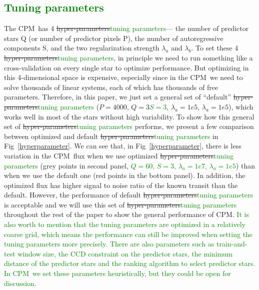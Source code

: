 \documentclass[12pt, preprint]{aastex}
\newcommand{\name}{CPM}
\newcommand{\revise}[1]{\textcolor{green}{#1}}
\newcommand{\remove}[1]{\sout{#1}}
\begin{document}
\subsection{\revise{Tuning parameters}}
The \name\ has 4 \remove{hyper-parameters}\revise{tuning parameters}--- 
  the number of predictor stars Q (or number of predictor pixels P), 
  the number of autoregressive components S, 
  and the two regularization strength $\lambda_{a}$ and $\lambda_{b}$.
To set these 4 \remove{hyper-parameters}\revise{tuning parameters}, 
  in principle we need to run something like a cross-validation on every single star to optimize performance.
But optimizing in this 4-dimensional space is expensive, 
  especially since in the \name\ we need to solve thousands of linear systems, 
  each of which has thousands of free parameters. 
Therefore, in this paper, 
  we just set a general set of ``default'' \remove{hyper-parameters}\revise{tuning parameters} ($P=4000$, \remove{$Q=3$}\revise{$S=3$}, $\lambda_a=1e5$, $\lambda_a=1e5$), 
  which works well in most of the stars without high variability. 
To show how this general set of \remove{hyper-parameters}\revise{tuning parameters} performs, 
  we present a few comparison between optimized and default \remove{hyper-parameters}\revise{tuning parameters} 
  in Fig~\ref{hyperparameter}.
We can see that, in Fig~\ref{hyperparameter}, 
  there is less variation in the \name\ flux 
  when we use optimized \remove{hyper-parameters}\revise{tuning parameters} (grey points in second panel, \revise{$Q=60$, $S=3$, $\lambda_a=1e7$, $\lambda_a=1e5$}) 
  than when we use the default one (red points in the bottom panel). 
In addition, the optimized flux has higher signal to noise ratio of the known transit than the default. 
However, the performance of default \remove{hyper-parameters}\revise{tuning parameters} is acceptable 
  and we will use this set of \remove{hyper-parameters}\revise{tuning parameters} throughout the rest of the paper 
  to show the general performance of \name. 
\revise{It is also worth to mention that the tuning parameters are optimized in a relatively coarse grid, which means the performance can still be improved when setting the tuning parameters more precisely.}
\revise{There are also parameters such as train-and-test window size, the CCD constraint on the predictor stars, the minimum distance of the predictor stars and the ranking algorithm to select predictor stars. In \name\ we set these parameters heuristically, but they could be open for discussion.}
  
\end{document}

